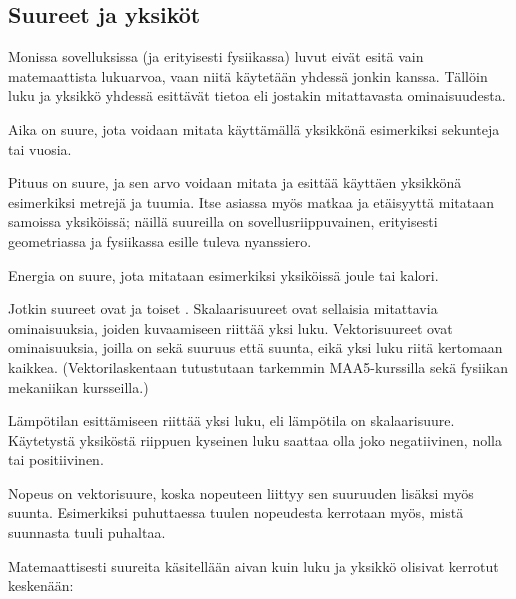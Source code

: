  \subsection*{Suureet ja yksiköt}

Monissa sovelluksissa (ja erityisesti fysiikassa) luvut eivät esitä vain matemaattista lukuarvoa, vaan niitä käytetään yhdessä jonkin  kanssa. Tällöin luku ja yksikkö yhdessä esittävät tietoa  eli jostakin mitattavasta ominaisuudesta.


\begin{esimerkki}

Aika on suure, jota voidaan mitata käyttämällä yksikkönä esimerkiksi sekunteja tai vuosia.

Pituus on suure, ja sen arvo voidaan mitata ja esittää käyttäen yksikkönä esimerkiksi metrejä ja tuumia. Itse asiassa myös matkaa ja etäisyyttä mitataan samoissa yksiköissä; näillä suureilla on sovellusriippuvainen, erityisesti geometriassa ja fysiikassa esille tuleva nyanssiero.

Energia on suure, jota mitataan esimerkiksi yksiköissä joule tai kalori.
\end{esimerkki}

Jotkin suureet ovat  ja toiset . Skalaarisuureet ovat sellaisia mitattavia ominaisuuksia, joiden kuvaamiseen riittää yksi luku. Vektorisuureet ovat ominaisuuksia, joilla on sekä suuruus että suunta, eikä yksi luku riitä kertomaan kaikkea. (Vektorilaskentaan tutustutaan tarkemmin MAA5-kurssilla sekä fysiikan mekaniikan kursseilla.)

\begin{esimerkki}

Lämpötilan esittämiseen riittää yksi luku, eli lämpötila on skalaarisuure. Käytetystä yksiköstä riippuen kyseinen luku saattaa olla joko negatiivinen, nolla tai positiivinen.

Nopeus on vektorisuure, koska nopeuteen liittyy sen suuruuden lisäksi myös suunta. Esimerkiksi puhuttaessa tuulen nopeudesta kerrotaan myös, mistä suunnasta tuuli puhaltaa.


\end{esimerkki}

Matemaattisesti suureita käsitellään aivan kuin luku ja yksikkö olisivat kerrotut keskenään:

